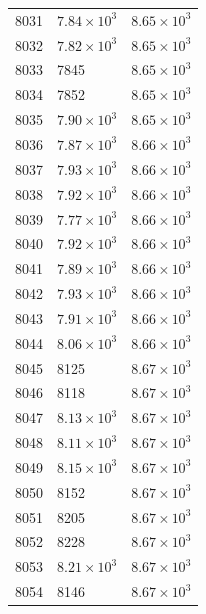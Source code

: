 \begin{table}[H]
\begin{tabular}{lll}
8031 & $\displaystyle 7.84 \times 10^{3}$ & $\displaystyle 8.65 \times 10^{3}$ \\
8032 & $\displaystyle 7.82 \times 10^{3}$ & $\displaystyle 8.65 \times 10^{3}$ \\
8033 & 7845 & $\displaystyle 8.65 \times 10^{3}$ \\
8034 & 7852 & $\displaystyle 8.65 \times 10^{3}$ \\
8035 & $\displaystyle 7.90 \times 10^{3}$ & $\displaystyle 8.65 \times 10^{3}$ \\
8036 & $\displaystyle 7.87 \times 10^{3}$ & $\displaystyle 8.66 \times 10^{3}$ \\
8037 & $\displaystyle 7.93 \times 10^{3}$ & $\displaystyle 8.66 \times 10^{3}$ \\
8038 & $\displaystyle 7.92 \times 10^{3}$ & $\displaystyle 8.66 \times 10^{3}$ \\
8039 & $\displaystyle 7.77 \times 10^{3}$ & $\displaystyle 8.66 \times 10^{3}$ \\
8040 & $\displaystyle 7.92 \times 10^{3}$ & $\displaystyle 8.66 \times 10^{3}$ \\
8041 & $\displaystyle 7.89 \times 10^{3}$ & $\displaystyle 8.66 \times 10^{3}$ \\
8042 & $\displaystyle 7.93 \times 10^{3}$ & $\displaystyle 8.66 \times 10^{3}$ \\
8043 & $\displaystyle 7.91 \times 10^{3}$ & $\displaystyle 8.66 \times 10^{3}$ \\
8044 & $\displaystyle 8.06 \times 10^{3}$ & $\displaystyle 8.66 \times 10^{3}$ \\
8045 & 8125 & $\displaystyle 8.67 \times 10^{3}$ \\
8046 & 8118 & $\displaystyle 8.67 \times 10^{3}$ \\
8047 & $\displaystyle 8.13 \times 10^{3}$ & $\displaystyle 8.67 \times 10^{3}$ \\
8048 & $\displaystyle 8.11 \times 10^{3}$ & $\displaystyle 8.67 \times 10^{3}$ \\
8049 & $\displaystyle 8.15 \times 10^{3}$ & $\displaystyle 8.67 \times 10^{3}$ \\
8050 & 8152 & $\displaystyle 8.67 \times 10^{3}$ \\
8051 & 8205 & $\displaystyle 8.67 \times 10^{3}$ \\
8052 & 8228 & $\displaystyle 8.67 \times 10^{3}$ \\
8053 & $\displaystyle 8.21 \times 10^{3}$ & $\displaystyle 8.67 \times 10^{3}$ \\
8054 & 8146 & $\displaystyle 8.67 \times 10^{3}$ \\

\end{tabular}
\end{table}
